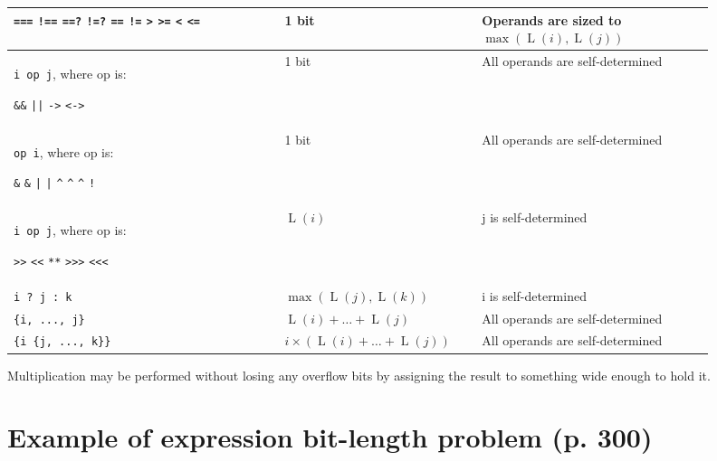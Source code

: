 \documentclass{article}
\DeclareMathOperator{\Size}{L}
\newcommand{\tild}{\raisebox{-.7ex}{\textasciitilde{}}}
\newcommand{\shiftOp}{\texttt{>{}>} \texttt{<}\texttt{<} \texttt{**}
\texttt{>{}>{}>} \texttt{<}\texttt{<}\texttt{<}}
\newcommand{\compOp}{\texttt{===} \texttt{!==} \texttt{==?} \texttt{!=?}
  \texttt{==} \texttt{!=} \texttt{>} \texttt{>=} \texttt{<} \texttt{<=}}
\newcommand{\logicOp}{\texttt{\&\&} \texttt{||} \texttt{->} \texttt{<->}}
\newcommand{\redOp}{\texttt{\&} \texttt{\tild\&} \texttt{|} \texttt{\tild|}
\texttt{\^{}} \texttt{\tild\^{}} \texttt{\^{}\tild} \texttt{!}}
\begin{document}
{\begin{center}
\begin{longtable}{|p{0.35\linewidth}|C{0.25\linewidth}|C{0.3\linewidth}|}
        \compOp{}
         & 1 bit
         & Operands are sized to $\max\left(\Size(i), \Size(j)\right)$ \\
        \hline
        \verb|i op j|, where op is:

        \logicOp{}
         & 1 bit
         & All operands are self-determined
        \\
        \hline
        \verb|op i|, where op is:

        \redOp{}
         & 1 bit
         & All operands are self-determined
        \\
        \hline
        \verb|i op j|, where op is:

        \shiftOp{}
         & $\Size(i)$
         & j is self-determined
        \\
        \hline
        \verb|i ? j : k|
         & $\max\left(\Size(j), \Size(k)\right)$
         & i is self-determined
        \\
        \hline
        \verb|{i, ..., j}|
         & $\Size(i) + \dots + \Size(j)$
         & All operands are self-determined
        \\
        \hline
        \verb|{i {j, ..., k}}|
         & $i\times\left(\Size(i) + \dots + \Size(j)\right)$
         & All operands are self-determined
        \\
        \hline
      \end{longtable}
    \end{center}

    Multiplication may be performed without losing any overflow bits by assigning
    the result to something wide enough to hold it.
  }

\section{Example of expression bit-length problem (p. 300)}

\textelp{}
\end{document}
